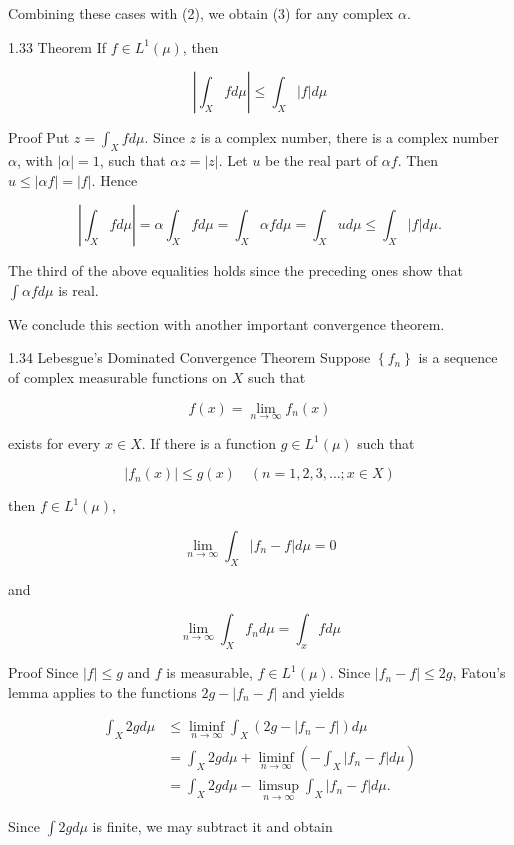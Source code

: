 \documentclass[10pt]{article}
\begin{document}
Combining these cases with (2), we obtain (3) for any complex $\alpha$.

1.33 Theorem If $f \in L^{1}(\mu)$, then

$$
\left|\int_{X} f d \mu\right| \leq \int_{X}|f| d \mu
$$

Proof Put $z=\int_{X} f d \mu$. Since $z$ is a complex number, there is a complex number $\alpha$, with $|\alpha|=1$, such that $\alpha z=|z|$. Let $u$ be the real part of $\alpha f$. Then $u \leq|\alpha f|=|f|$. Hence

$$
\left|\int_{X} f d \mu\right|=\alpha \int_{X} f d \mu=\int_{X} \alpha f d \mu=\int_{X} u d \mu \leq \int_{X}|f| d \mu .
$$

The third of the above equalities holds since the preceding ones show that $\int \alpha f d \mu$ is real.

We conclude this section with another important convergence theorem.

1.34 Lebesgue's Dominated Convergence Theorem Suppose $\left\{f_{n}\right\}$ is a sequence of complex measurable functions on $X$ such that

$$
f(x)=\lim _{n \rightarrow \infty} f_{n}(x)
$$

exists for every $x \in X$. If there is a function $g \in L^{1}(\mu)$ such that

$$
\left|f_{n}(x)\right| \leq g(x) \quad(n=1,2,3, \ldots ; x \in X)
$$

then $f \in L^{1}(\mu)$,

$$
\lim _{n \rightarrow \infty} \int_{X}\left|f_{n}-f\right| d \mu=0
$$

and

$$
\lim _{n \rightarrow \infty} \int_{X} f_{n} d \mu=\int_{x} f d \mu
$$

Proof Since $|f| \leq g$ and $f$ is measurable, $f \in L^{1}(\mu)$. Since $\left|f_{n}-f\right| \leq 2 g$, Fatou's lemma applies to the functions $2 g-\left|f_{n}-f\right|$ and yields

$$
\begin{aligned}
\int_{X} 2 g d \mu & \leq \liminf _{n \rightarrow \infty} \int_{X}\left(2 g-\left|f_{n}-f\right|\right) d \mu \\
& =\int_{X} 2 g d \mu+\liminf _{n \rightarrow \infty}\left(-\int_{X}\left|f_{n}-f\right| d \mu\right) \\
& =\int_{X} 2 g d \mu-\limsup _{n \rightarrow \infty} \int_{X}\left|f_{n}-f\right| d \mu .
\end{aligned}
$$

Since $\int 2 g d \mu$ is finite, we may subtract it and obtain
\end{document}
